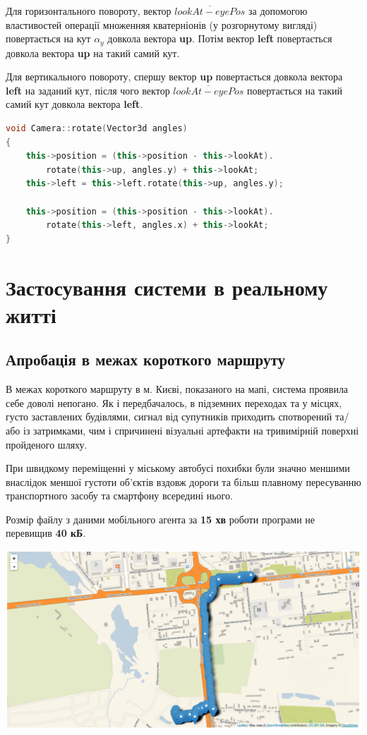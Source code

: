 \documentclass[simple,a4paper,14pt,ukrainian,utf8]{eskdtext}
\begin{document}
        Для горизонтального повороту, вектор $\overline{lookAt - eyePos}$ за допомогою властивостей операції множенняя кватерніонів (у розгорнутому вигляді) повертається на кут $\alpha_y$ довкола вектора \textbf{up}. Потім вектор \textbf{left} повертається довкола вектора \textbf{up} на такий самий кут.
        
        Для вертикального повороту, спершу вектор \textbf{up} повертається довкола вектора \textbf{left} на заданий кут, після чого вектор $\overline{lookAt - eyePos}$ повертається на такий самий кут довкола вектора \textbf{left}. 
        
\begin{small}
\begin{lstlisting}[language=C++]
void Camera::rotate(Vector3d angles)
{
    this->position = (this->position - this->lookAt).
    	rotate(this->up, angles.y) + this->lookAt;
    this->left = this->left.rotate(this->up, angles.y);

    this->position = (this->position - this->lookAt).
    	rotate(this->left, angles.x) + this->lookAt;
}
\end{lstlisting}
\end{small}
        
    \newpage \section{Застосування системи в реальному житті}

	\subsection{Апробація в межах короткого маршруту}
	
	В межах короткого маршруту в м. Києві, показаного на мапі, система проявила себе доволі непогано. Як і передбачалось, в підземних переходах та у місцях, густо заставлених будівлями, сигнал від супутників приходить спотворений та/або із затримками, чим і спричинені візуальні артефакти на тривимірній поверхні пройденого шляху.
	
	При швидкому переміщенні у міському автобусі похибки були значно меншими внаслідок меншої густоти об’єктів вздовж дороги та більш плавному пересуванню транспортного засобу та смартфону всередині нього.
	
	Розмір файлу з даними мобільного агента за \textbf{15 хв} роботи програми не перевищив \textbf{40 кБ}.
	
	\vspace{2em}
	\includegraphics[scale=0.35]{images/results1.png}
	
\end{document}
